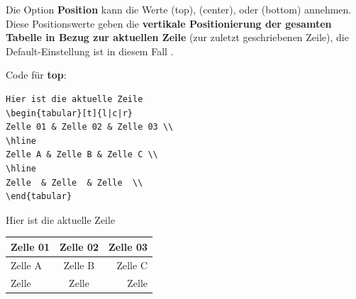 \begin{frame}[fragile]
	
Die Option \textbf{Position} kann die Werte  (top),  (center), oder  (bottom) annehmen. 
Diese Positionswerte geben die \textbf{vertikale Positionierung der gesamten Tabelle in Bezug zur aktuellen Zeile} (zur zuletzt geschriebenen Zeile), die Default-Einstellung ist in diesem Fall .

\begin{multicols}{2}

Code für \textbf{top}:
	
		\columnbreak
		
{\scriptsize
\begin{lstlisting}
Hier ist die aktuelle Zeile
\begin{tabular}[t]{l|c|r}
Zelle 01 & Zelle 02 & Zelle 03 \\
\hline
Zelle A & Zelle B & Zelle C \\
\hline
Zelle  & Zelle  & Zelle  \\
\end{tabular}
\end{lstlisting}
}
	
\end{multicols}
	
Hier ist die aktuelle Zeile	
	\begin{tabular}[t]{l|c|r}
		Zelle 01 & Zelle 02 & Zelle 03 \\
		\hline
		Zelle A & Zelle B & Zelle C \\
		\hline
		Zelle  & Zelle  & Zelle  \\
	\end{tabular}

\end{frame}


